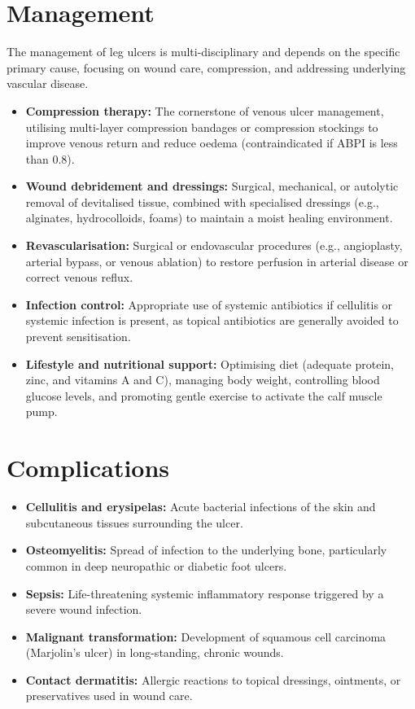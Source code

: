 \section*{Management}
The management of leg ulcers is multi-disciplinary and depends on the specific primary cause, focusing on wound care, compression, and addressing underlying vascular disease.
\begin{itemize}
    \item \textbf{Compression therapy:} The cornerstone of venous ulcer management, utilising multi-layer compression bandages or compression stockings to improve venous return and reduce oedema (contraindicated if ABPI is less than 0.8).
    \item \textbf{Wound debridement and dressings:} Surgical, mechanical, or autolytic removal of devitalised tissue, combined with specialised dressings (e.g., alginates, hydrocolloids, foams) to maintain a moist healing environment.
    \item \textbf{Revascularisation:} Surgical or endovascular procedures (e.g., angioplasty, arterial bypass, or venous ablation) to restore perfusion in arterial disease or correct venous reflux.
    \item \textbf{Infection control:} Appropriate use of systemic antibiotics if cellulitis or systemic infection is present, as topical antibiotics are generally avoided to prevent sensitisation.
    \item \textbf{Lifestyle and nutritional support:} Optimising diet (adequate protein, zinc, and vitamins A and C), managing body weight, controlling blood glucose levels, and promoting gentle exercise to activate the calf muscle pump.
\end{itemize}

\section*{Complications}
\begin{itemize}
    \item \textbf{Cellulitis and erysipelas:} Acute bacterial infections of the skin and subcutaneous tissues surrounding the ulcer.
    \item \textbf{Osteomyelitis:} Spread of infection to the underlying bone, particularly common in deep neuropathic or diabetic foot ulcers.
    \item \textbf{Sepsis:} Life-threatening systemic inflammatory response triggered by a severe wound infection.
    \item \textbf{Malignant transformation:} Development of squamous cell carcinoma (Marjolin's ulcer) in long-standing, chronic wounds.
    \item \textbf{Contact dermatitis:} Allergic reactions to topical dressings, ointments, or preservatives used in wound care.
\end{itemize}

